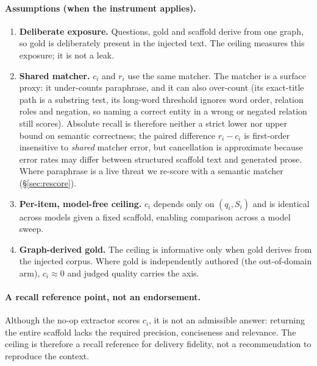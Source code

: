 \documentclass[10pt,twocolumn]{article}
\begin{document}
\paragraph{Assumptions (when the instrument applies).}
\begin{enumerate}[label=(A\arabic*),topsep=2pt,itemsep=1pt,leftmargin=2.4em]
\item \textbf{Deliberate exposure.} Questions, gold and scaffold derive from one graph, so gold is deliberately present in the injected text. The ceiling measures this exposure; it is not a leak.
\item \textbf{Shared matcher.} $c_i$ and $r_i$ use the same matcher. The matcher is a surface proxy: it under-counts paraphrase, and it can also over-count (its exact-title path is a substring test, its long-word threshold ignores word order, relation roles and negation, so naming a correct entity in a wrong or negated relation still scores). Absolute recall is therefore neither a strict lower nor upper bound on semantic correctness; the paired difference $r_i-c_i$ is first-order insensitive to \emph{shared} matcher error, but cancellation is approximate because error rates may differ between structured scaffold text and generated prose. Where paraphrase is a live threat we re-score with a semantic matcher (\S\ref{sec:rescore}).
\item \textbf{Per-item, model-free ceiling.} $c_i$ depends only on $(q_i,S_i)$ and is identical across models given a fixed scaffold, enabling comparison across a model sweep.
\item \textbf{Graph-derived gold.} The ceiling is informative only when gold derives from the injected corpus. Where gold is independently authored (the out-of-domain arm), $c_i\approx0$ and judged quality carries the axis.
\end{enumerate}

\paragraph{A recall reference point, not an endorsement.} Although the no-op extractor scores $c_i$, it is not an admissible answer: returning the entire scaffold lacks the required precision, conciseness and relevance. The ceiling is therefore a recall reference for delivery fidelity, not a recommendation to reproduce the context.
\end{document}
